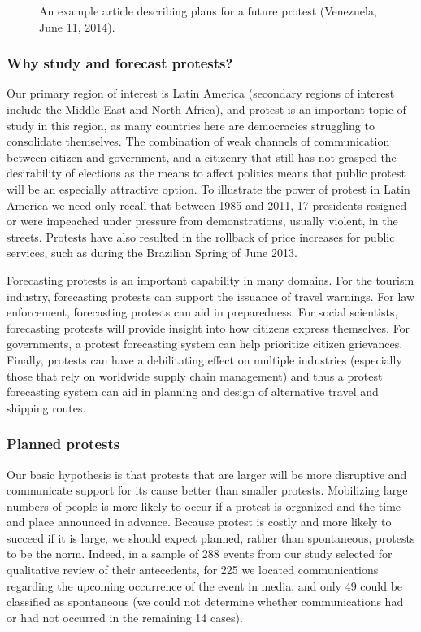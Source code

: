 \documentclass[letterpaper]{article}
\begin{document}
\begin{wrapfigure}{r}{.4\textwidth}
  \centering
    \caption{An example article describing plans for a future protest (Venezuela, June 11, 2014).}
    \label{pp_example}
\end{wrapfigure}

\subsubsection{Why study and forecast protests?}
Our primary region of interest is Latin America (secondary regions of
interest include the Middle East and North Africa), and protest is an
important topic of study in this region, as many countries here are
democracies struggling to consolidate themselves. The combination of
weak channels of communication between citizen and government, and a
citizenry that still has not grasped the desirability of elections as
the means to affect politics means that public protest will be an
especially attractive option. To illustrate the power of protest in
Latin America we need only recall that between 1985 and 2011, 17
presidents resigned or were impeached under pressure from
demonstrations, usually violent, in the streets. Protests have also
resulted in the rollback of price increases for public services, such as
during the Brazilian Spring of June 2013.

Forecasting protests is an important capability in many domains.  For
the tourism industry, forecasting protests can support the issuance of
travel warnings. For law enforcement, forecasting protests can aid in
preparedness. For social scientists, forecasting protests will provide
insight into how citizens express themselves.  For governments, a
protest forecasting system can help prioritize citizen grievances.
Finally, protests can have a debilitating effect on multiple industries
(especially those that rely on worldwide supply chain management) and
thus a protest forecasting system can aid in planning and design of
alternative travel and shipping routes.

\subsubsection{Planned protests}
Our basic hypothesis is that protests that are larger will be more
disruptive and communicate support for its cause better than smaller
protests.  Mobilizing large numbers of people is more likely to occur if
a protest is organized and the time and place announced in advance.
Because protest is costly and more likely to succeed if it is large, we
should expect planned, rather than spontaneous, protests to be the norm.
Indeed, in a sample of 288 events from our study selected for
qualitative review of their antecedents, for 225 we located
communications regarding the upcoming occurrence of the event in media,
and only 49 could be classified as spontaneous (we could not determine
whether communications had or had not occurred in the remaining 14
cases).
\end{document}
